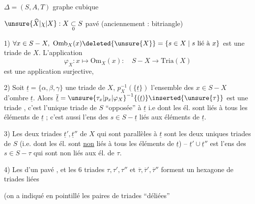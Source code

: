 $\Delta=(S,A,T)$ graphe cubique

$\unsure{\widehat X|\chi|X}:X\mathrel{\underset{0}{\subset}}S$ pavé (anciennement : bitriangle)

1) $\forall x\in S-X,\ \mathrm{Omb}_X(x)\deleted{\unsure{X}}=\{s\in X\mid s\ \text{lié à }x\}$ est une triade de $X$. L'application
\[
\varphi_X:x\longmapsto\mathrm{Om}_X(x):\quad S-X\longrightarrow\mathrm{Tria}(X)
\]
est une application surjective, 

2) Soit $\underline t=\{\alpha,\beta,\gamma\}$ une triade de $X$, $p_X^{-1}(\{\underline t\})$ l'ensemble des $x\in S-X$ d'ombre $\underline t$. Alors $\overline{\underline t}={\unsure{\tau_x|p_x|\varphi_X}}^{-1}\{(\underline t)\}\inserted{\unsure{\tau}}$ est une triade , c'est l'unique triade \inserted{$\overline\tau$} de $S$ ``opposée'' à $\underline t$ i.e  dont les él. sont  liés à tous les éléments de $\underline t$ ; c'est aussi l'ens des $s\in S-\underline t$  liés aux éléments de $\underline t$. 

3) Les deux triades $\underline t',\underline t''$ de  $X$ qui sont parallèles à $\underline t$  sont les deux uniques triades de $S$   (i.e. dont les él. sont \uline{non} liés à tous les éléments de $\underline t$) -- $\underline t'\cup\underline t''$ est l'ens des $s\in S-\tau$ qui sont non liés aux él. de $\tau$.

4) Les   d'un pavé , et les 6 triades $\tau,\tau',\tau''$ et $\overline\tau,\overline\tau',\overline\tau''$ forment un hexagone de triades liées


(on a indiqué en pointillé les paires de triades ``déliées'' 


